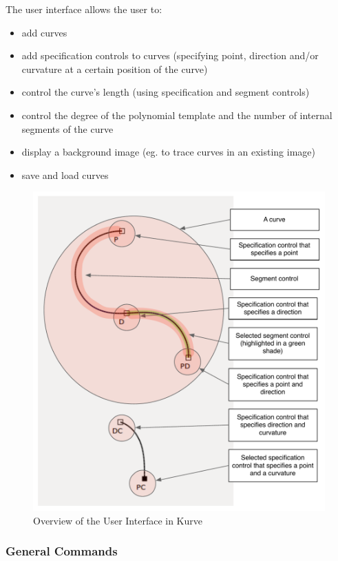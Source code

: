 \documentclass[a4paper]{article}
\begin{document}
				The user interface allows the user to:
				\begin{itemize}
					\item add curves
					\item add specification controls to curves (specifying point, direction and/or curvature at a certain position of the curve) 
					\item control the curve's length (using specification and segment controls)
					\item control the degree of the polynomial template and the number of internal segments of the curve
					\item display a background image (eg. to trace curves in an existing image)
					\item save and load curves
				\end{itemize}
				
				\begin{figure}[htb]
					\centering
					\includegraphics[width=\textwidth]{../resources/ui_components.pdf}
					\caption{Overview of the User Interface in Kurve}
					\label{figure:ui_components}
				\end{figure}
				
				\subsubsection{General Commands}
				
\end{document}

